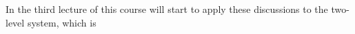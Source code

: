 In the third lecture of this course will start to apply these discussions to the two-level system, which is 